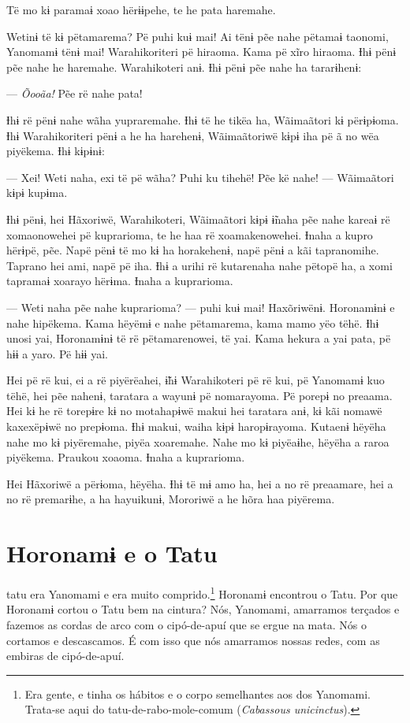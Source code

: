 Të mo kɨ paramaɨ xoao hërɨɨpehe, te he pata haremahe. 

Wetinɨ të kɨ pëtamarema? Pë puhi kuɨ mai! Ai tënɨ pẽe nahe pëtamaɨ
taonomi, Yanomamɨ tënɨ mai! Warahikoriteri pë hiraoma. Kama pë xĩro
hiraoma. Ɨhɨ pënɨ pẽe nahe he haremahe. Warahikoteri anɨ. Ɨhɨ pënɨ pẽe
nahe ha tararɨhenɨ: 

--- \textit{Õooãa!} Pẽe rë nahe pata! 

Ɨhɨ rë pënɨ nahe wãha yupraremahe. Ɨhɨ të he tikëa ha, Wãimaãtori kɨ
përɨpɨoma. Ɨhɨ Warahikoriteri pënɨ a he ha harehenɨ, Wãimaãtoriwë kɨpɨ
iha pë ã no wëa piyëkema. Ɨhɨ kɨpɨnɨ:

--- Xei! Weti naha, exi të pë wãha? Puhi ku tihehë! Pẽe kë nahe! ---
Wãimaãtori kɨpɨ kupɨma.

Ɨhɨ pënɨ, hei Hãxoriwë, Warahikoteri, Wãimaãtori kɨpɨ ɨ̃naha pẽe nahe
kareaɨ rë xomaonowehei pë kuprarioma, te he haa rë xoamakenowehei. Ɨnaha
a kupro hërɨpë, pẽe. Napë pënɨ të mo kɨ ha horakehenɨ, napë pënɨ a kãi
tapranomihe. Taprano hei ami, napë pë iha. Ɨhɨ a urihi rë kutarenaha
nahe pëtopë ha, a xomi tapramaɨ xoarayo hërɨma. Ɨnaha a kuprarioma. 

--- Weti naha pẽe nahe kuprarioma? --- puhi kuɨ mai! Haxõriwënɨ. Horonamɨnɨ
 e nahe hipëkema. Kama hëyëmɨ e nahe pëtamarema, kama mamo yëo tëhë. Ɨhɨ
 unosi yai, Horonamɨnɨ të rë pëtamarenowei, të yai. Kama hekura a yai
 pata, pë hɨɨ a yaro. Pë hɨɨ yai. 

Hei pë rë kui, ei a rë piyërëahei, ɨ̃hɨ Warahikoteri pë rë kui, pë
 Yanomamɨ kuo tëhë, hei pẽe nahenɨ, taratara a wayunɨ pë nomarayoma. Pë
 porepɨ no preaama. Hei kɨ he rë torepɨre kɨ no motahapɨwë makui hei
 taratara anɨ, kɨ kãi nomawë kaxexëpɨwë no prepɨoma. Ɨhɨ makui, waiha
 kɨpɨ haropɨrayoma. Kutaenɨ hëyëha nahe mo kɨ piyëremahe, piyëa
 xoaremahe. Nahe mo kɨ piyëaɨhe, hëyëha a raroa piyëkema. Praukou xoaoma.
 Ɨnaha a kuprarioma. 

Hei Hãxoriwë a përɨoma, hëyëha. Ɨhɨ të mɨ amo ha, hei a no rë preaamare,
hei a no rë premarɨhe, a ha hayuikunɨ, Mororiwë a he hõra haa piyërema.

\chapter*{Horonamɨ e o Tatu\smallskip{}}

 tatu era Yanomami e era muito comprido.\footnote{Era gente, e tinha os hábitos e o corpo semelhantes aos dos Yanomami. Trata-se aqui do tatu-de-rabo-mole-comum (\textit{Cabassous unicinctus}).}  Horonamɨ encontrou o Tatu. Por que Horonamɨ cortou o Tatu bem na cintura? Nós, Yanomami, amarramos terçados e fazemos as cordas de arco com o cipó-de-apuí que se ergue na
mata. Nós o cortamos e descascamos. É com isso que nós amarramos nossas
redes, com as embiras de cipó-de-apuí. 

